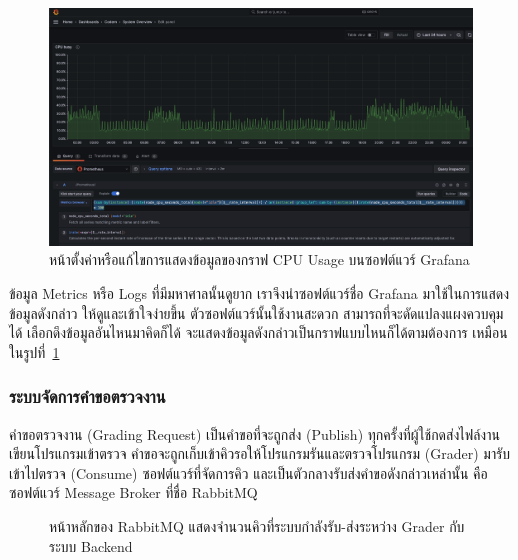 \documentclass[12pt,one side,openright,a4paper]{cpe-thesis-th}
\newcommand{\thaijustify}[1]{%
  \par\hspace{30pt}\justifying
  #1
}
\begin{document}
\begin{figure}[H]
  \centering
  \includegraphics[width=12cm]{figure/results/grafana-edit.png}
  \caption[การนิยามและสร้างกราฟในซอฟต์แวร์ Grafana]{หน้าตั้งค่าหรือแก้ไขการแสดงข้อมูลของกราฟ CPU Usage บนซอฟต์แวร์ Grafana}
  \label{fig:res-grafana-edit}
\end{figure}
\thaijustify{
  ข้อมูล Metrics หรือ Logs ที่มีมหาศาลนั้นดูยาก เราจึงนำซอฟต์แวร์ชื่อ Grafana มาใช้ในการแสดงข้อมูลดังกล่าว ให้ดูและเข้าใจง่ายขึ้น ตัวซอฟต์แวร์นั้นใช้งานสะดวก สามารถที่จะดัดแปลงแผงควบคุมได้ เลือกดึงข้อมูลอันไหนมาคิดก็ได้ จะแสดงข้อมูลดังกล่าวเป็นกราฟแบบไหนก็ได้ตามต้องการ เหมือนในรูปที่~\ref{fig:res-grafana-edit}
}
\subsubsection{ระบบจัดการคำขอตรวจงาน}
\thaijustify{
  คำขอตรวจงาน (Grading Request) เป็นคำขอที่จะถูกส่ง (Publish) ทุกครั้งที่ผู้ใช้กดส่งไฟล์งานเขียนโปรแกรมเข้าตรวจ คำขอจะถูกเก็บเข้าคิวรอให้โปรแกรมรันและตรวจโปรแกรม (Grader) มารับเข้าไปตรวจ (Consume) ซอฟต์แวร์ที่จัดการคิว และเป็นตัวกลางรับส่งคำขอดังกล่าวเหล่านั้น คือซอฟต์แวร์ Message Broker ที่ชื่อ RabbitMQ
}
\begin{figure}[H]
  \centering
  \caption[หน้าหลักของ RabbitMQ]{หน้าหลักของ RabbitMQ แสดงจำนวนคิวที่ระบบกำลังรับ-ส่งระหว่าง Grader กับระบบ Backend}
  \label{fig:res-rabbitmq}
\end{figure}
\end{document}
